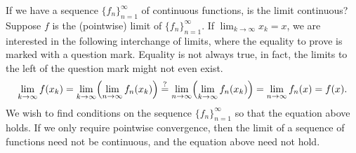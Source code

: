 If we have a sequence $\{ f_n \}_{n=1}^\infty$ of continuous functions, is the limit continuous?
Suppose $f$ is the (pointwise) limit of $\{ f_n \}_{n=1}^\infty$.
If $\lim_{k\to\infty} x_k = x$,
we are interested in the following
interchange of limits, where the equality to prove
is marked with a question mark.  Equality is not always true, in fact, the limits to the left
of the question mark might not even exist.
\begin{equation*}
\lim_{k \to \infty} 
f(x_k)
=
\lim_{k \to \infty} 
\Bigl(
\lim_{n \to \infty} f_n(x_k)
\Bigr)
\overset{?}{=}
\lim_{n \to \infty}
\Bigl(
\lim_{k \to \infty} 
f_n(x_k)
\Bigr)
=
\lim_{n \to \infty}
f_n(x)
=
f(x) .
\end{equation*}
We wish to find conditions on the sequence $\{ f_n \}_{n=1}^\infty$
so that the equation above holds.
If we only require pointwise convergence, then the limit
of a sequence of functions need not be continuous, and the equation above
need not hold.

